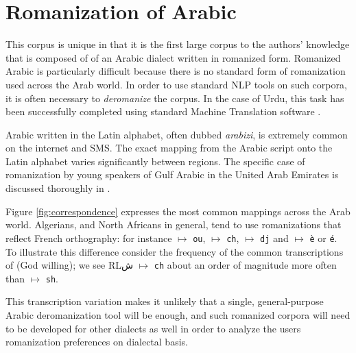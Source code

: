 \documentclass[10pt, a4paper]{article}
\begin{document}
\section{Romanization of Arabic}
This corpus is unique in that it is the first large corpus to the
authors' knowledge that is composed of of an Arabic dialect written in
romanized form. Romanized Arabic is particularly difficult because
there is no standard form of romanization used across the Arab
world. In order to use standard NLP tools on such corpora, it is often
necessary to \emph{deromanize} the corpus. In the case of Urdu, this
task has been successfully completed using standard Machine
Translation software \cite{irvine2012processing}.

Arabic written in the Latin alphabet, often dubbed \emph{arabizi}, is
extremely common on the internet and SMS.  The exact mapping from the
Arabic script onto the Latin alphabet varies significantly between
regions.  The specific case of romanization by young speakers of Gulf
Arabic in the United Arab Emirates is discussed thoroughly in
.  

Figure \ref{fig:correspondence} expresses the most common mappings across the Arab
world.  Algerians, and North Africans in general, tend to use
romanizations that reflect French orthography: for instance 
$\mapsto$ \texttt{ou},  $\mapsto$ \texttt{ch},  $\mapsto$
\texttt{dj} and  $\mapsto$ \texttt{\`{e}} or \texttt{\'{e}}. 
To illustrate this difference consider the frequency of the common 
transcriptions of  (God willing); 
we see RL{ش} $\mapsto$ \texttt{ch} about an order of magnitude
more often than  $\mapsto$ \texttt{sh}.

This transcription variation makes it unlikely that a single,
general-purpose Arabic deromanization tool will be enough, and such
romanized corpora will need to be developed for other dialects as well
in order to analyze the users romanization preferences on dialectal
basis.
\end{document}
